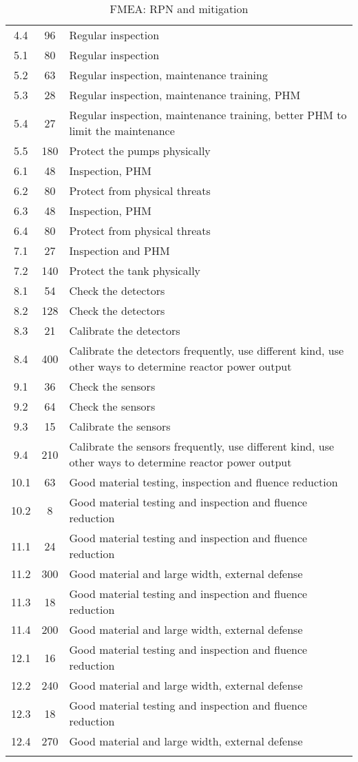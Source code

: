 \begin{longtable}{ccp{10cm}}
    4.4 & 96  & Regular inspection \\
    5.1 & 80  & Regular inspection \\
    5.2 & 63  & Regular inspection, maintenance training \\
    5.3 & 28  & Regular inspection, maintenance training, PHM \\
    5.4 & 27  & Regular inspection, maintenance training, better PHM to limit the maintenance \\
    5.5 & 180 & Protect the pumps physically \\
    6.1 & 48  & Inspection, PHM \\
    6.2 & 80  & Protect from physical threats \\
    6.3 & 48  & Inspection, PHM \\
    6.4 & 80  & Protect from physical threats \\
    7.1 & 27  & Inspection and PHM \\
    7.2 & 140 & Protect the tank physically \\
    8.1 & 54  & Check the detectors \\
    8.2 & 128 & Check the detectors \\
    8.3 & 21  & Calibrate the detectors \\
    8.4 & 400 & Calibrate the detectors frequently, use different kind, use other ways to determine reactor power output \\
    9.1 & 36  & Check the sensors \\
    9.2 & 64 & Check the sensors \\
    9.3 & 15  & Calibrate the sensors \\
    9.4 & 210 & Calibrate the sensors frequently, use different kind, use other ways to determine reactor power output \\
    10.1 & 63 & Good material testing, inspection and fluence reduction \\
    10.2 & 8  & Good material testing and inspection and fluence reduction \\
    11.1 & 24 & Good material testing and inspection and fluence reduction \\
    11.2 & 300 & Good material and large width, external defense \\
    11.3 & 18 & Good material testing and inspection and fluence reduction \\
    11.4 & 200 & Good material and large width, external defense \\
    12.1 & 16 & Good material testing and inspection and fluence reduction \\
    12.2 & 240 & Good material and large width, external defense \\
    12.3 & 18 & Good material testing and inspection and fluence reduction \\
    12.4 & 270 & Good material and large width, external defense \\
    \caption{FMEA: RPN and mitigation}\label{tab:fmea_rpn_risk}
\end{longtable}






\
